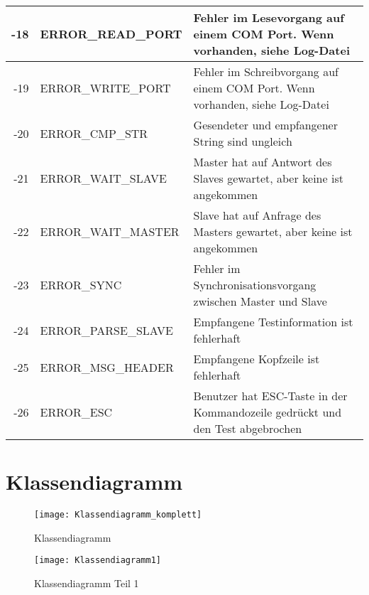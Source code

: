 \begin{longtable}{||r|l|p{8cm}||}
-18 & ERROR\_READ\_PORT      & Fehler im Lesevorgang auf einem COM Port. Wenn vorhanden, siehe Log-Datei \\ \hline
-19 & ERROR\_WRITE\_PORT     & Fehler im Schreibvorgang auf einem COM Port. Wenn vorhanden, siehe Log-Datei \\ \hline
-20 & ERROR\_CMP\_STR        & Gesendeter und empfangener String sind ungleich \\ \hline
-21 & ERROR\_WAIT\_SLAVE     & Master hat auf Antwort des Slaves gewartet, aber keine ist angekommen \\ \hline
-22 & ERROR\_WAIT\_MASTER    & Slave hat auf Anfrage des Masters gewartet, aber keine ist angekommen \\ \hline
-23 & ERROR\_SYNC            & Fehler im Synchronisationsvorgang zwischen Master und Slave \\ \hline
-24 & ERROR\_PARSE\_SLAVE    & Empfangene Testinformation ist fehlerhaft \\ \hline
-25 & ERROR\_MSG\_HEADER     & Empfangene Kopfzeile ist fehlerhaft \\ \hline
-26 & ERROR\_ESC             & Benutzer hat ESC-Taste in der Kommandozeile gedrückt und den Test abgebrochen \\ \hline
\end{longtable}



\section{Klassendiagramm}

\begin{figure}[h]
  \begin{center}
    \texttt{[image: Klassendiagramm\_komplett]}
  		  \caption{Klassendiagramm}
     \label{KlassenDiagramm}
  \end{center}
\end{figure}



\begin{figure}[h]
  \begin{center}
    \texttt{[image: Klassendiagramm1]}
  		  \caption{Klassendiagramm Teil 1}
     \label{KlassenDiagramm1}
  \end{center}
\end{figure}

